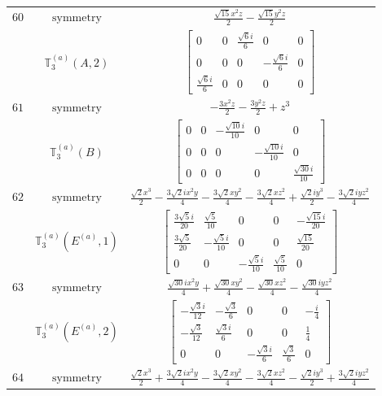 \documentclass[fleqn,8pt,landscape]{jsarticle}
\begin{document}
\begin{longtable}{ccc}
$ 60 $ & $ \text{symmetry} $ & $ \frac{\sqrt{15} x^{2} z}{2} - \frac{\sqrt{15} y^{2} z}{2} $ \\
$  $ & $ \mathbb{T}_{3}^{(a)}(A,2) $ & $ \begin{bmatrix} 0 & 0 & \frac{\sqrt{6} i}{6} & 0 & 0 \\ 0 & 0 & 0 & - \frac{\sqrt{6} i}{6} & 0 \\ \frac{\sqrt{6} i}{6} & 0 & 0 & 0 & 0 \end{bmatrix} $ \\ \hline
$ 61 $ & $ \text{symmetry} $ & $ - \frac{3 x^{2} z}{2} - \frac{3 y^{2} z}{2} + z^{3} $ \\
$  $ & $ \mathbb{T}_{3}^{(a)}(B) $ & $ \begin{bmatrix} 0 & 0 & - \frac{\sqrt{10} i}{10} & 0 & 0 \\ 0 & 0 & 0 & - \frac{\sqrt{10} i}{10} & 0 \\ 0 & 0 & 0 & 0 & \frac{\sqrt{30} i}{10} \end{bmatrix} $ \\ \hline
$ 62 $ & $ \text{symmetry} $ & $ \frac{\sqrt{2} x^{3}}{2} - \frac{3 \sqrt{2} i x^{2} y}{4} - \frac{3 \sqrt{2} x y^{2}}{4} - \frac{3 \sqrt{2} x z^{2}}{4} + \frac{\sqrt{2} i y^{3}}{2} - \frac{3 \sqrt{2} i y z^{2}}{4} $ \\
$  $ & $ \mathbb{T}_{3}^{(a)}(E^{(a)},1) $ & $ \begin{bmatrix} \frac{3 \sqrt{5} i}{20} & \frac{\sqrt{5}}{10} & 0 & 0 & - \frac{\sqrt{15} i}{20} \\ \frac{3 \sqrt{5}}{20} & - \frac{\sqrt{5} i}{10} & 0 & 0 & \frac{\sqrt{15}}{20} \\ 0 & 0 & - \frac{\sqrt{5} i}{10} & \frac{\sqrt{5}}{10} & 0 \end{bmatrix} $ \\ \hline
$ 63 $ & $ \text{symmetry} $ & $ \frac{\sqrt{30} i x^{2} y}{4} + \frac{\sqrt{30} x y^{2}}{4} - \frac{\sqrt{30} x z^{2}}{4} - \frac{\sqrt{30} i y z^{2}}{4} $ \\
$  $ & $ \mathbb{T}_{3}^{(a)}(E^{(a)},2) $ & $ \begin{bmatrix} - \frac{\sqrt{3} i}{12} & - \frac{\sqrt{3}}{6} & 0 & 0 & - \frac{i}{4} \\ - \frac{\sqrt{3}}{12} & \frac{\sqrt{3} i}{6} & 0 & 0 & \frac{1}{4} \\ 0 & 0 & - \frac{\sqrt{3} i}{6} & \frac{\sqrt{3}}{6} & 0 \end{bmatrix} $ \\ \hline
$ 64 $ & $ \text{symmetry} $ & $ \frac{\sqrt{2} x^{3}}{2} + \frac{3 \sqrt{2} i x^{2} y}{4} - \frac{3 \sqrt{2} x y^{2}}{4} - \frac{3 \sqrt{2} x z^{2}}{4} - \frac{\sqrt{2} i y^{3}}{2} + \frac{3 \sqrt{2} i y z^{2}}{4} $ \\

\end{longtable}
\end{document}
